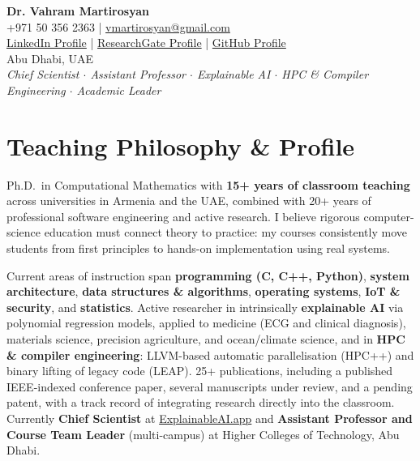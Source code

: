 \documentclass[a4paper,12pt]{article}
\begin{document}
\pagestyle{empty}

\begin{center}
  {\Huge\bfseries Dr. Vahram Martirosyan}\\[4pt]
  \small
  +971 50 356 2363 \quad|\quad
  \href{mailto:vmartirosyan@gmail.com}{vmartirosyan@gmail.com} \\
  \href{https://www.linkedin.com/in/vahrammartirosyan}{LinkedIn Profile} \quad | \quad
  \href{https://www.researchgate.net/profile/Vahram-Martirosyan-2}{ResearchGate Profile} \quad | \quad 
  \href{https://github.com/vmartirosyan}{GitHub Profile} \\
  Abu Dhabi, UAE\\[3pt]
  \textit{Chief Scientist $\cdot$ Assistant Professor $\cdot$ Explainable AI $\cdot$ HPC \& Compiler Engineering $\cdot$ Academic Leader}
\end{center}

\section*{Teaching Philosophy \& Profile}
\setlength{\parskip}{5pt}
Ph.D.\ in Computational Mathematics with \textbf{15+ years of classroom teaching} across universities in Armenia
and the UAE, combined with 20+ years of professional software engineering and active research.
I believe rigorous computer-science education must connect theory to practice: my courses consistently
move students from first principles to hands-on implementation using real systems.

Current areas of instruction span \textbf{programming (C, C++, Python)}, \textbf{system architecture},
\textbf{data structures \& algorithms}, \textbf{operating systems}, \textbf{IoT \& security},
and \textbf{statistics}. Active researcher in intrinsically \textbf{explainable AI} via polynomial
regression models, applied to medicine (ECG and clinical diagnosis), materials science, precision
agriculture, and ocean/climate science, and in \textbf{HPC \& compiler engineering}: LLVM-based
automatic parallelisation (HPC++) and binary lifting of legacy code (LEAP). 25+ publications,
including a published IEEE-indexed conference paper, several manuscripts under review, and a
pending patent, with a track record of integrating research directly into the classroom.
Currently \textbf{Chief Scientist} at \href{https://www.explainableai.app}{ExplainableAI.app} and
\textbf{Assistant Professor and Course Team Leader} (multi-campus) at Higher Colleges of Technology, Abu Dhabi.
\setlength{\parskip}{0pt}
\end{document}
